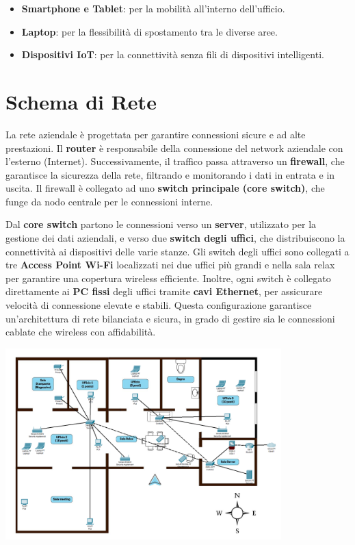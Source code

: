 \documentclass{assignment}
\begin{document}
\begin{itemize}
    \item \textbf{Smartphone e Tablet}: per la mobilità all'interno dell'ufficio.
    \item \textbf{Laptop}: per la flessibilità di spostamento tra le diverse aree.
    \item \textbf{Dispositivi IoT}: per la connettività senza fili di dispositivi intelligenti.
\end{itemize}


\section{Schema di Rete}

La rete aziendale è progettata per garantire connessioni sicure e ad alte prestazioni. Il \textbf{router} è responsabile della connessione del network aziendale con l'esterno (Internet). Successivamente, il traffico passa attraverso un \textbf{firewall}, che garantisce la sicurezza della rete, filtrando e monitorando i dati in entrata e in uscita. Il firewall è collegato ad uno \textbf{switch principale (core switch)}, che funge da nodo centrale per le connessioni interne.

Dal \textbf{core switch} partono le connessioni verso un \textbf{server}, utilizzato per la gestione dei dati aziendali, e verso due \textbf{switch degli uffici}, che distribuiscono la connettività ai dispositivi delle varie stanze. Gli switch degli uffici sono collegati a tre \textbf{Access Point Wi-Fi} localizzati nei due uffici più grandi e nella sala relax per garantire una copertura wireless efficiente. Inoltre, ogni switch è collegato direttamente ai \textbf{PC fissi} degli uffici tramite \textbf{cavi Ethernet}, per assicurare velocità di connessione elevate e stabili. Questa configurazione garantisce un'architettura di rete bilanciata e sicura, in grado di gestire sia le connessioni cablate che wireless con affidabilità.


\begin{center}
    \includegraphics[width=0.8\textwidth]{assets/FloorPlanConDevice.png}
    \end{center}
\end{document}
